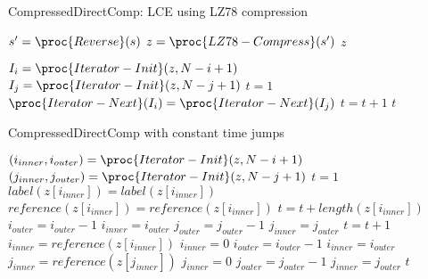 \begin{algorithm}
\caption{CompressedDirectComp: LCE using LZ78 compression\label{alg:lce-lz}}
\begin{codebox}
\li $s' = \proc{Reverse}(s)$
\li $z = \proc{LZ78-Compress}(s')$
\li \Return $z$
\end{codebox}

\begin{codebox}
\li $I_i = \proc{Iterator-Init}(z, N-i+1)$
\li $I_j = \proc{Iterator-Init}(z, N-j+1)$
\li $t = 1$
\li \While $\proc{Iterator-Next}(I_i) = \proc{Iterator-Next}(I_j)$
    \Indentmore
\li     $t = t + 1$
    \End
\li \Return $t$
\end{codebox}
\end{algorithm}

\begin{algorithm}
\caption{CompressedDirectComp with constant time jumps\label{alg:lce-lz-jump}}
\begin{codebox}
\li $(i_{inner}, i_{outer}) = \proc{Iterator-Init}(z, N-i+1)$
\li $(j_{inner}, j_{outer}) = \proc{Iterator-Init}(z, N-j+1)$
\li $t = 1$
\li \While $label(z[i_{inner}]) = label(z[i_{inner}])$
    \Indentmore
\li     \If $reference(z[i_{inner}]) = reference(z[i_{inner}])$
        \Indentmore
\li         $t = t + length(z[i_{inner}])$
\li         $i_{outer} = i_{outer} - 1$
\li         $i_{inner} = i_{outer}$
\li         $j_{outer} = j_{outer} - 1$
\li         $j_{inner} = j_{outer}$
\li     \Else
\li         $t = t + 1$
\li         $i_{inner} = reference(z[i_{inner}])$
\li         \If $i_{inner} = 0$
            \Indentmore
\li             $i_{outer} = i_{outer} - 1$
\li             $i_{inner} = i_{outer}$
            \End
\li         $j_{inner} = reference(z[j_{inner}])$
\li         \If $j_{inner} = 0$
            \Indentmore
\li             $j_{outer} = j_{outer} - 1$
\li             $j_{inner} = j_{outer}$
            \End
        \End
    \End
\li \Return $t$
\end{codebox}
\end{algorithm}
